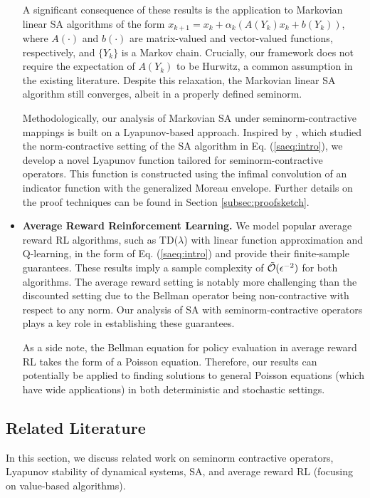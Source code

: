 \documentclass[11 pt]{article}
\begin{document}
\begin{itemize}
		A significant consequence of these results is the application to Markovian linear SA algorithms of the form $x_{k+1} = x_k + \alpha_k(A(Y_k)x_k + b(Y_k))$, where $A(\cdot)$ and $b(\cdot)$ are matrix-valued and vector-valued functions, respectively, and $\{Y_k\}$ is a Markov chain. Crucially, our framework does not require the expectation of $A(Y_k)$ to be Hurwitz, a common assumption in the existing literature. Despite this relaxation, the Markovian linear SA algorithm still converges, albeit in a properly defined seminorm.
		
		Methodologically, our analysis of Markovian SA under seminorm-contractive mappings is built on a Lyapunov-based approach. Inspired by \cite{chen2021lyapunov}, which studied the norm-contractive setting of the SA algorithm in Eq. (\ref{saeq:intro}), we develop a novel Lyapunov function tailored for seminorm-contractive operators. This function is constructed using the infimal convolution of an indicator function with the generalized Moreau envelope. Further details on the proof techniques can be found in Section \ref{subsec:proofsketch}.
		
		
		
		\item \textbf{Average Reward Reinforcement Learning.} We model popular average reward RL algorithms, such as TD($\lambda$) with linear function approximation and Q-learning, in the form of Eq. (\ref{saeq:intro}) and provide their finite-sample guarantees. These results imply a sample complexity of $\Tilde{\mathcal{O}}(\epsilon^{-2})$ for both algorithms. The average reward setting is notably more challenging than the discounted setting due to the Bellman operator being non-contractive with respect to any norm. Our analysis of SA with seminorm-contractive operators plays a key role in establishing these guarantees. 
		
		As a side note, the Bellman equation for policy evaluation in average reward RL takes the form of a Poisson equation. Therefore, our results can potentially be applied to finding solutions to general Poisson equations (which have wide applications) in both deterministic and stochastic settings.
	\end{itemize}
	
	
	
	
	\subsection{Related Literature}
	\label{subsec:literature}
	In this section, we discuss related work on seminorm contractive operators, Lyapunov stability of dynamical systems, SA, and average reward RL (focusing on value-based algorithms).
	
\end{document}
